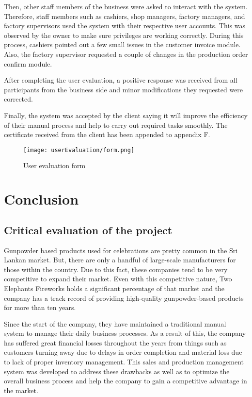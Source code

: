 \documentclass[12pt]{report}
\begin{document}
Then, other staff members of the business were asked to interact with the system. Therefore, staff members such as cashiers, shop managers, factory managers, and factory supervisors used the system with their respective user accounts. This was observed by the owner to make sure privileges are working correctly. During this process, cashiers pointed out a few small issues in the customer invoice module. Also, the factory supervisor requested a couple of changes in the production order confirm module.

After completing the user evaluation, a positive response was received from all participants from the business side and minor modifications they requested were corrected.

Finally, the system was accepted by the client saying it will improve the efficiency of their manual process and help to carry out required tasks smoothly. The certificate received from the client has been appended to appendix F.

\begin{figure}[H]
	\centering
	\texttt{[image: userEvaluation/form.png]}
	\caption{User evaluation form}
\end{figure}

\chapter{Conclusion}

\section{Critical evaluation of the project}
Gunpowder based products used for celebrations are pretty common in the Sri Lankan market. But, there are only a handful of large-scale manufacturers for those within the country. Due to this fact, these companies tend to be very competitive to expand their market. Even with this competitive nature, Two Elephants Fireworks holds a significant percentage of that market and the company has a track record of providing high-quality gunpowder-based products for more than ten years.

Since the start of the company, they have maintained a traditional manual system to manage their daily business processes. As a result of this, the company has suffered great financial losses throughout the years from things such as customers turning away due to delays in order completion and material loss due to lack of proper inventory management. This sales and production management system was developed to address these drawbacks as well as to optimize the overall business process and help the company to gain a competitive advantage in the market.
\end{document}
